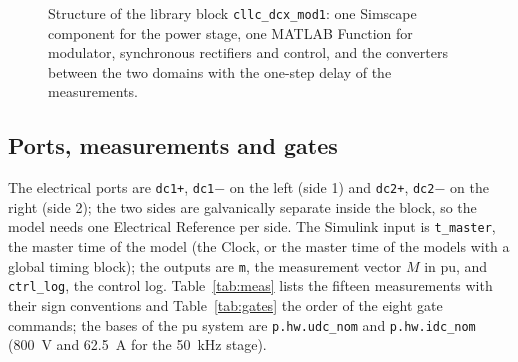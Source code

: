 \documentclass[12pt,a4paper]{scrartcl}
\newcommand{\code}[1]{\texttt{#1}}
\begin{document}
\begin{onehalfspace}
\begin{figure}[H]
	\captionsetup{width=0.85\textwidth, font=small}
	\caption[Structure of the library block.]{Structure of the library block \code{cllc\_dcx\_mod1}: one Simscape component for the power stage, one MATLAB Function for modulator, synchronous rectifiers and control, and the converters between the two domains with the one-step delay of the measurements.}
	\label{fig:block}
\end{figure}

\subsection{Ports, measurements and gates}
\label{sec:ports}

The electrical ports are \code{dc1+}, \code{dc1$-$} on the left (side 1) and \code{dc2+}, \code{dc2$-$} on the right (side 2); the two sides are galvanically separate inside the block, so the model needs one Electrical Reference per side. The Simulink input is \code{t\_master}, the master time of the model (the Clock, or the master time of the models with a global timing block); the outputs are \code{m}, the measurement vector $M$ in pu, and \code{ctrl\_log}, the control log. Table~\ref{tab:meas} lists the fifteen measurements with their sign conventions and Table~\ref{tab:gates} the order of the eight gate commands; the bases of the pu system are \code{p.hw.udc\_nom} and \code{p.hw.idc\_nom} (\SI{800}{\volt} and \SI{62.5}{\ampere} for the \SI{50}{\kilo\hertz} stage).


\end{onehalfspace}
\end{document}
